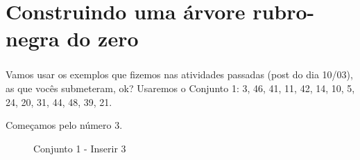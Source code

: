   \section{Construindo uma árvore rubro-negra do zero}
  \begin{frame}[fragile]
\frametitle{\secname}

Vamos usar os exemplos que fizemos nas atividades passadas (post do dia 10/03), as que vocês submeteram, ok?
Usaremos o Conjunto 1: 3, 46, 41, 11, 42, 14, 10, 5, 24, 20, 31, 44, 48, 39, 21.

Começamos pelo número 3.
\begin{figure}[H]
  
  \centering
  \caption{Conjunto 1 - Inserir 3}
  \tiny
{}
\end{figure}
\end{frame}

